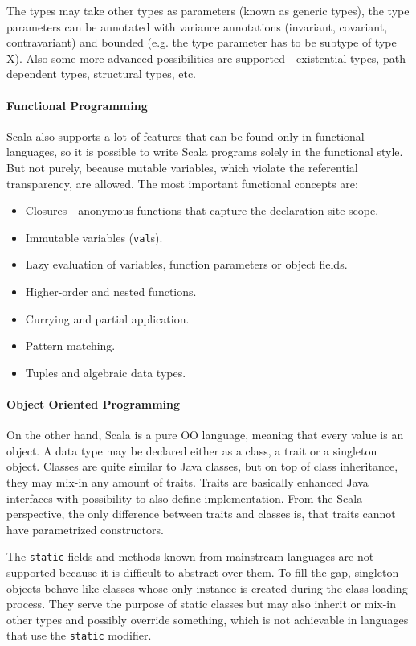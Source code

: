 \documentclass[12pt,a4paper]{report}
\begin{document}
The types may take other types as parameters (known as generic types), the type parameters can be annotated with variance annotations (invariant, covariant, contravariant) and bounded (e.g. the type parameter has to be subtype of type X). Also some more advanced possibilities are supported - existential types, path-dependent types, structural types, etc\cite{ScalaAdvancedTypes}.

\paragraph{Functional Programming} Scala also supports a lot of features that can be found only in functional languages, so it is possible to write Scala programs solely in the functional style. But not purely, because mutable variables, which violate the referential transparency, are allowed. The most important functional concepts are:

\begin{itemize}
\item Closures - anonymous functions that capture the declaration site scope.
\item Immutable variables (\texttt{val}s).
\item Lazy evaluation of variables, function parameters or object fields.
\item Higher-order and nested functions.
\item Currying and partial application.
\item Pattern matching.
\item Tuples and algebraic data types.
\end{itemize}

\paragraph{Object Oriented Programming} On the other hand, Scala is a pure OO language, meaning that every value is an object. A data type may be declared either as a class, a trait or a singleton object. Classes are quite similar to Java classes, but on top of class inheritance, they may mix-in any amount of traits. Traits are basically enhanced Java interfaces with possibility to also define implementation. From the Scala perspective, the only difference between traits and classes is, that traits cannot have parametrized constructors.

The \texttt{static} fields and methods known from mainstream languages are not supported because it is difficult to abstract over them. To fill the gap, singleton objects behave like classes whose only instance is created during the class-loading process. They serve the purpose of static classes but may also inherit or mix-in other types and possibly override something, which is not achievable in languages that use the \texttt{static} modifier.
\end{document}

